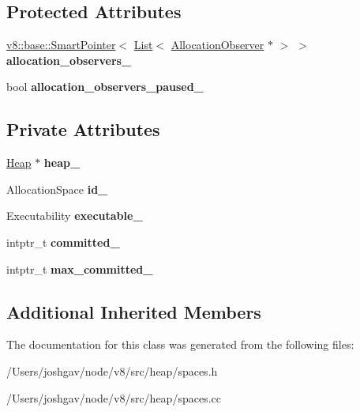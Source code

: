 \subsection*{Protected Attributes}
\begin{DoxyCompactItemize}
\item 
\hyperlink{classv8_1_1base_1_1_smart_pointer}{v8\+::base\+::\+Smart\+Pointer}$<$ \hyperlink{classv8_1_1internal_1_1_list}{List}$<$ \hyperlink{classv8_1_1internal_1_1_allocation_observer}{Allocation\+Observer} $\ast$ $>$ $>$ {\bfseries allocation\+\_\+observers\+\_\+}\hypertarget{classv8_1_1internal_1_1_space_abf28d3251fd1e137fd773b9820778dd2}{}\label{classv8_1_1internal_1_1_space_abf28d3251fd1e137fd773b9820778dd2}

\item 
bool {\bfseries allocation\+\_\+observers\+\_\+paused\+\_\+}\hypertarget{classv8_1_1internal_1_1_space_a30f3271188f7df5287a6af154d8ecdfb}{}\label{classv8_1_1internal_1_1_space_a30f3271188f7df5287a6af154d8ecdfb}

\end{DoxyCompactItemize}
\subsection*{Private Attributes}
\begin{DoxyCompactItemize}
\item 
\hyperlink{classv8_1_1internal_1_1_heap}{Heap} $\ast$ {\bfseries heap\+\_\+}\hypertarget{classv8_1_1internal_1_1_space_aa86f85f7596832e68f1d1a9d1458c380}{}\label{classv8_1_1internal_1_1_space_aa86f85f7596832e68f1d1a9d1458c380}

\item 
Allocation\+Space {\bfseries id\+\_\+}\hypertarget{classv8_1_1internal_1_1_space_a42824dc491cc01ddaf9b369ff7a3bef3}{}\label{classv8_1_1internal_1_1_space_a42824dc491cc01ddaf9b369ff7a3bef3}

\item 
Executability {\bfseries executable\+\_\+}\hypertarget{classv8_1_1internal_1_1_space_ae83028032ac49d59555ce756b728950c}{}\label{classv8_1_1internal_1_1_space_ae83028032ac49d59555ce756b728950c}

\item 
intptr\+\_\+t {\bfseries committed\+\_\+}\hypertarget{classv8_1_1internal_1_1_space_af16baf123ddb7d2750ef899f2aec8101}{}\label{classv8_1_1internal_1_1_space_af16baf123ddb7d2750ef899f2aec8101}

\item 
intptr\+\_\+t {\bfseries max\+\_\+committed\+\_\+}\hypertarget{classv8_1_1internal_1_1_space_a48d47e8da4325a2f204d1cd6b108d78f}{}\label{classv8_1_1internal_1_1_space_a48d47e8da4325a2f204d1cd6b108d78f}

\end{DoxyCompactItemize}
\subsection*{Additional Inherited Members}


The documentation for this class was generated from the following files\+:\begin{DoxyCompactItemize}
\item 
/\+Users/joshgav/node/v8/src/heap/spaces.\+h\item 
/\+Users/joshgav/node/v8/src/heap/spaces.\+cc\end{DoxyCompactItemize}

